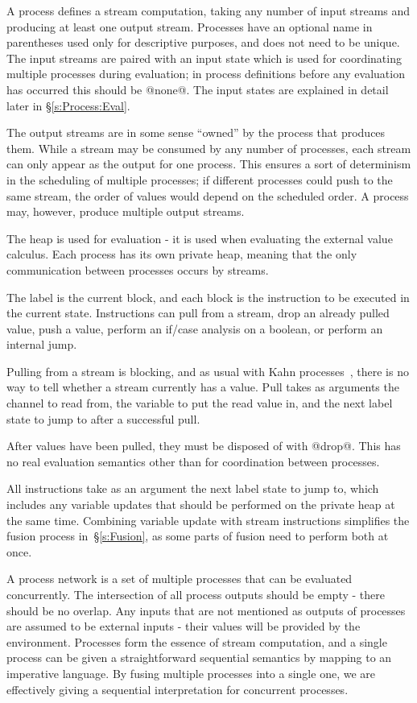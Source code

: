 A process defines a stream computation, taking any number of input streams and producing at least one output stream.
Processes have an optional name in parentheses used only for descriptive purposes, and does not need to be unique.
The input streams are paired with an input state which is used for coordinating multiple processes during evaluation; in process definitions before any evaluation has occurred this should be @none@.
The input states are explained in detail later in \S\ref{s:Process:Eval}.

The output streams are in some sense ``owned'' by the process that produces them.
While a stream may be consumed by any number of processes, each stream can only appear as the output for one process.
This ensures a sort of determinism in the scheduling of multiple processes; if different processes could push to the same stream, the order of values would depend on the scheduled order.
A process may, however, produce multiple output streams.

The heap is used for evaluation - it is used when evaluating the external value calculus.
Each process has its own private heap, meaning that the only communication between processes occurs by streams.

The label is the current block, and each block is the instruction to be executed in the current state.
Instructions can pull from a stream, drop an already pulled value, push a value, perform an if/case analysis on a boolean, or perform an internal jump.

Pulling from a stream is blocking, and as usual with Kahn processes~\cite{kahn1976coroutines}, there is no way to tell whether a stream currently has a value.
Pull takes as arguments the channel to read from, the variable to put the read value in, and the next label state to jump to after a successful pull.

After values have been pulled, they must be disposed of with @drop@.
This has no real evaluation semantics other than for coordination between processes.

All instructions take as an argument the next label state to jump to, which includes any variable updates that should be performed on the private heap at the same time.
Combining variable update with stream instructions simplifies the fusion process in~\S\ref{s:Fusion}, as some parts of fusion need to perform both at once.


A process network is a set of multiple processes that can be evaluated concurrently.
The intersection of all process outputs should be empty - there should be no overlap.
Any inputs that are not mentioned as outputs of processes are assumed to be external inputs - their values will be provided by the environment.
Processes form the essence of stream computation, and a single process can be given a straightforward sequential semantics by mapping to an imperative language.
By fusing multiple processes into a single one, we are effectively giving a sequential interpretation for concurrent processes.


